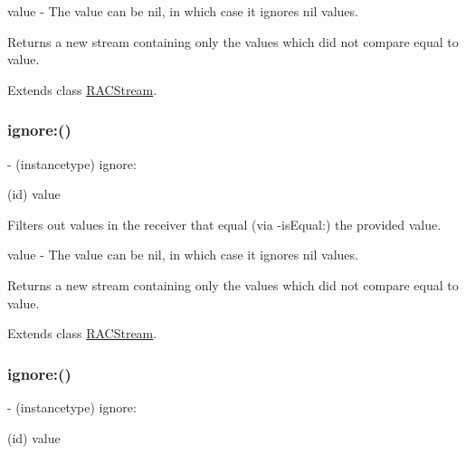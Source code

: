 value -\/ The value can be {\ttfamily nil}, in which case it ignores {\ttfamily nil} values.

Returns a new stream containing only the values which did not compare equal to {\ttfamily value}. 

Extends class \mbox{\hyperlink{interface_r_a_c_stream_aa0bf73c86006176e745390ee2b3645b2}{R\+A\+C\+Stream}}.

\mbox{\label{category_r_a_c_stream_07_operations_08_aa0bf73c86006176e745390ee2b3645b2}} 
\subsubsection{\texorpdfstring{ignore\+:()}{ignore:()}\hspace{0.1cm}{\footnotesize\ttfamily [2/3]}}
{\footnotesize\ttfamily -\/ (instancetype) ignore\+: \begin{DoxyParamCaption}\item[{(id)}]{value }\end{DoxyParamCaption}}

Filters out values in the receiver that equal (via -\/is\+Equal\+:) the provided value.

value -\/ The value can be {\ttfamily nil}, in which case it ignores {\ttfamily nil} values.

Returns a new stream containing only the values which did not compare equal to {\ttfamily value}. 

Extends class \mbox{\hyperlink{interface_r_a_c_stream_aa0bf73c86006176e745390ee2b3645b2}{R\+A\+C\+Stream}}.

\mbox{\label{category_r_a_c_stream_07_operations_08_aa0bf73c86006176e745390ee2b3645b2}} 
\subsubsection{\texorpdfstring{ignore\+:()}{ignore:()}\hspace{0.1cm}{\footnotesize\ttfamily [3/3]}}
{\footnotesize\ttfamily -\/ (instancetype) ignore\+: \begin{DoxyParamCaption}\item[{(id)}]{value }\end{DoxyParamCaption}}


